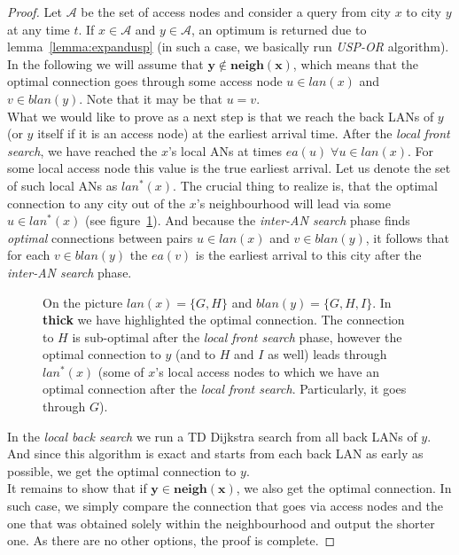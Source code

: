 		\begin{proof}
			Let $\mathcal{A}$ be the set of access nodes and consider a query from city $x$ to city $y$ at any time $t$. If $x \in \mathcal{A}$ and $y \in \mathcal{A}$, an optimum is returned due to lemma~\ref{lemma:expandusp} (in such a case, we basically run \textit{USP-OR} algorithm). \\
			
			\noindent In the following we will assume that $\bm{y \not \in neigh(x)}$, which means that the optimal connection goes through some access node $u \in lan(x)$ and $v \in blan(y)$. Note that it may be that $u = v$. \\
			
			\noindent What we would like to prove as a next step is that we reach the back LANs of $y$ (or $y$ itself if it is an access node) at the earliest arrival time. After the \textit{local front search}, we have reached the $x$'s local ANs at times $ea(u) \; \forall u \in lan(x)$. For some local access node this value is the true earliest arrival. Let us denote the set of such local ANs as $lan^{*}(x)$. The crucial thing to realize is, that the optimal connection to any city out of the $x$'s neighbourhood will lead via some $u \in lan^{*}(x)$ (see figure~\ref{fig:usporaproof2}). And because the \textit{inter-AN search} phase finds \textit{optimal} connections between pairs $u \in lan(x)$ and $v \in blan(y)$, it follows that for each $v \in blan(y)$ the $ea(v)$ is the earliest arrival to this city after the \textit{inter-AN search} phase.
			
			\begin{figure}[h!]
				\begin{center}
				\end{center}
				\caption{\label{fig:usporaproof2} On the picture $lan(x) = \{G, H\}$ and $blan(y) = \{G, H, I\}$. In \textbf{thick} we have highlighted the optimal connection. The connection to $H$ is sub-optimal after the \textit{local front search} phase, however the optimal connection to $y$ (and to $H$ and $I$ as well) leads through $lan^{*}(x)$ (some of $x$'s local access nodes to which we have an optimal connection after the \textit{local front search}. Particularly, it goes through $G$).}
			\end{figure}
			
			In the \textit{local back search} we run a TD Dijkstra search from all back LANs of $y$. And since this algorithm is exact and starts from each back LAN as early as possible, we get the optimal connection to $y$. \\
			
			\noindent It remains to show that if $\bm{y \in neigh(x)}$, we also get the optimal connection. In such case, we simply compare the connection that goes via access nodes and the one that was obtained solely within the neighbourhood and output the shorter one. As there are no other options, the proof is complete.
		\end{proof}
	
